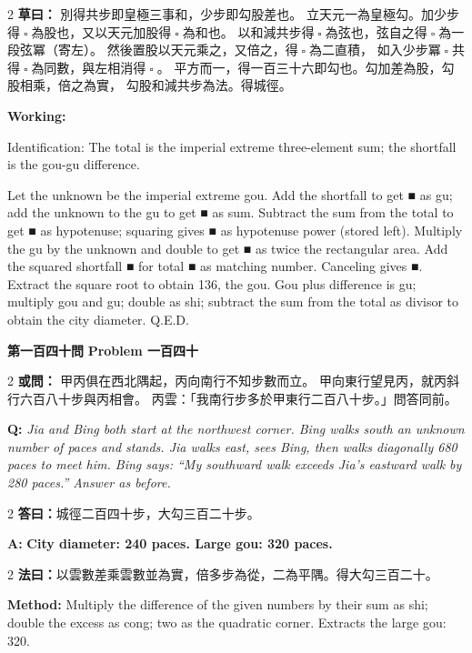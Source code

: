 \documentclass[11pt,a4paper]{article}
\let\origsquare\square
\renewcommand{\square}{\ensuremath{\origsquare}}%
\newcommand{\wen}[1]{%
  \par\vspace{0.5em}%
  \noindent\textcolor{problemcolor}{\textbf{第#1問}}%
  \hfill\textcolor{problemcolor}{\textbf{Problem #1}}\par\nopagebreak%
  \vspace{0.3em}%
}
\newcommand{\owen}[1]{%
  \noindent\textcolor{problemcolor}{\textbf{或問：}}{\tradfont #1}\par\nopagebreak%
}
\newcommand{\oweneng}[1]{%
  \noindent\textcolor{engcolor}{\textbf{Q: }}{\itshape #1}\par\nopagebreak%
}
\newcommand{\fayue}[1]{%
  \noindent\textcolor{methodcolor}{\textbf{法曰：}}{\tradfont #1}\par\nopagebreak%
}
\newcommand{\fayueeng}[1]{%
  \noindent\textcolor{engcolor}{\textbf{Method: }}{#1}\par\nopagebreak%
}
\newcommand{\tsaoyue}[1]{%
  \noindent\textcolor{workcolor}{\textbf{草曰：}}{\tradfont #1}\par%
}
\newcommand{\tsaoyueeng}[1]{%
  \noindent\textcolor{engcolor}{\textbf{Working: }}{\small #1}\par%
}
\newcommand{\dayue}[1]{%
  \noindent\textcolor{anscolor}{\textbf{答曰：}}{\tradfont #1}\par\nopagebreak%
}
\newcommand{\dayueeng}[1]{%
  \noindent\textcolor{engcolor}{\textbf{A: }}{\bfseries #1}\par\nopagebreak%
}
\begin{document}
\begin{paracol}{2}
\tsaoyue{%
別得共步即皇極三事和，少步即勾股差也。
立天元一為皇極勾。加少步得$ \; \square \; $為股也，又以天元加股得$ \; \square \; $為和也。
以和減共步得$ \; \square \; $為弦也，弦自之得$ \; \square \; $為一段弦冪（寄左）。
然後置股以天元乘之，又倍之，得$ \; \square \; $為二直積，
如入少步冪$ \; \square \; $共得$ \; \square \; $為同數，與左相消得$ \; \square \; $。
平方而一，得一百三十六即勾也。勾加差為股，勾股相乘，倍之為實，
勾股和減共步為法。得城徑。}
\switchcolumn
\tsaoyueeng{%
Identification: The total is the imperial extreme three-element sum; the shortfall is the gou-gu difference.

Let the unknown be the imperial extreme gou. Add the shortfall to get ■ as gu; add the unknown to the gu to get ■ as sum. Subtract the sum from the total to get ■ as hypotenuse; squaring gives ■ as hypotenuse power (stored left). Multiply the gu by the unknown and double to get ■ as twice the rectangular area. Add the squared shortfall ■ for total ■ as matching number. Canceling gives ■. Extract the square root to obtain 136, the gou. Gou plus difference is gu; multiply gou and gu; double as shi; subtract the sum from the total as divisor to obtain the city diameter. Q.E.D.}
\end{paracol}

\vspace{0.5cm}

\wen{一百四十}

\begin{paracol}{2}
\owen{%
甲丙俱在西北隅起，丙向南行不知步數而立。
甲向東行望見丙，就丙斜行六百八十步與丙相會。
丙雲：「我南行步多於甲東行二百八十步。」問答同前。}
\switchcolumn
\oweneng{%
Jia and Bing both start at the northwest corner. Bing walks south an unknown number of paces and stands. Jia walks east, sees Bing, then walks diagonally 680 paces to meet him. Bing says: ``My southward walk exceeds Jia's eastward walk by 280 paces.'' Answer as before.}
\end{paracol}

\begin{paracol}{2}
\dayue{城徑二百四十步，大勾三百二十步。}
\switchcolumn
\dayueeng{City diameter: 240 paces. Large gou: 320 paces.}
\end{paracol}

\begin{paracol}{2}
\fayue{以雲數差乘雲數並為實，倍多步為從，二為平隅。得大勾三百二十。}
\switchcolumn
\fayueeng{Multiply the difference of the given numbers by their sum as shi; double the excess as cong; two as the quadratic corner. Extracts the large gou: 320.}
\end{paracol}
\end{document}
